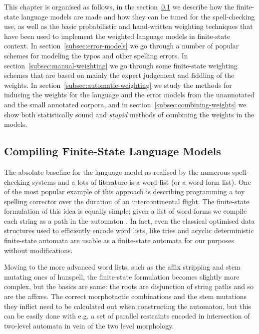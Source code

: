 \documentclass[a4paper,12pt]{article}
\begin{document}
This chapter is organised as follows, in the
section~\ref{subsec:language-models} we describe how the finite-state language
models are made and how they can be tuned for the spell-checking use, as well
as the basic probabilistic and hand-written weighting techniques that have been
used to implement the weighted language models in finite-state context. In
section~\ref{subsec:error-models} we go through a number of popular schemes for
modeling the typos and other spelling errors.  In
section~\ref{subsec:manual-weighting} we go through some finite-state weighting
schemes that are based on mainly the expert judgement and fiddling of the
weights.  In section~\ref{subsec:automatic-weighting} we study the methods for
inducing the weights for the language and the error models from the unannotated
and the small annotated corpora, and in section~\ref{subsec:combining-weights}
we show both statistically sound and \emph{stupid} methods of combining the
weights in the models.

\subsection{Compiling Finite-State Language Models}
\label{subsec:language-models}

The absolute baseline for the language model as realised by the numerous
spell-checking systems and a lots of literature is a word-list (or a word-form
list). One of the most popular example of this approach
is \cite[]{norvig/2010} describing programming a toy spelling corrector over
the duration of an intercontinental flight. The finite-state formulation of
this idea is equally simple; given a list of word-forms we compile each string
as a path in the automaton \cite[]{pirinen2012effects}. In fact, even the
classical optimised data structures used to efficiently encode word lists, like
tries and acyclic deterministic finite-state automata are usable as
a finite-state automata for our purposes without modifications.

Moving to the more advanced word lists, such as the affix stripping and stem
mutating ones of hunspell, the finite-state formulation becomes slightly more
complex, but the basics are same: the roots are disjunction of string paths and
so are the affixes. The correct morphotactic combinations and the stem
mutations they inflict need to be calculated out when constructing the
automaton, but this can be easily done with e.g. a set of parallel restraints
encoded in intersection of two-level automata \cite[]{pirinen2010creating} in
vein of the two level morphology.
\end{document}
